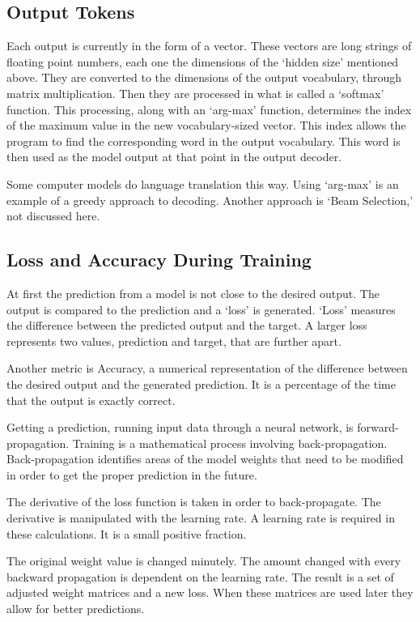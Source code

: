 \subsection{Output Tokens}
Each output is currently in the form of a vector. These vectors are long strings of floating point numbers, each one the dimensions of the `hidden size' mentioned above. They are converted to the dimensions of the output vocabulary, through matrix multiplication. Then they are processed in what is called a `softmax' function. This processing, along with an `arg-max' function, determines the index of the maximum value in the new vocabulary-sized vector. This index allows the program to find the corresponding word in the output vocabulary. This word is then used as the model output at that point in the output decoder.

Some computer models do language translation this way. Using `arg-max' is an example of a greedy approach to decoding. Another approach is `Beam Selection,' not discussed here. 



\subsection{Loss and Accuracy During Training}

At first the prediction from a model is not close to the desired output. The output is compared to the prediction and a `loss' is generated. `Loss' measures the difference between the predicted output and the target. A larger loss represents two values, prediction and target, that are further apart. 

Another metric is Accuracy, a numerical representation of the difference between the desired output and the generated prediction. It is a percentage of the time that the output is exactly correct.

Getting a prediction, running input data through a neural network, is forward-propagation. Training is a mathematical process involving back-propagation. Back-propagation identifies areas of the model weights that need to be modified in order to get the proper prediction in the future.

The derivative of the loss function is taken in order to back-propagate. The derivative is manipulated with the learning rate. A learning rate is required in these calculations. It is a small positive fraction. 

The original weight value is changed minutely. The amount changed with every backward propagation is dependent on the learning rate. The result is a set of adjusted weight matrices and a new loss. When these matrices are used later they allow for better predictions. 

